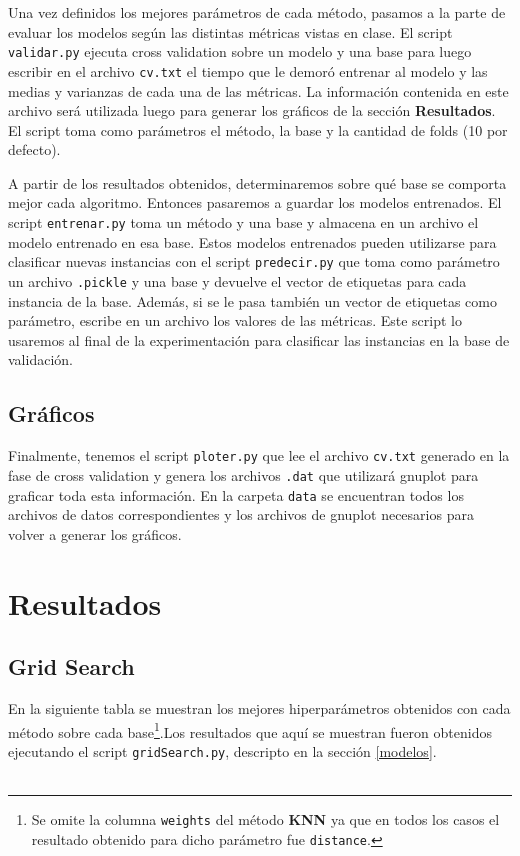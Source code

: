 \documentclass[10pt, a4paper]{article}
\begin{document}
Una vez definidos los mejores parámetros de cada método, pasamos a la parte de evaluar los modelos según las distintas métricas vistas en clase. El script \texttt{validar.py} ejecuta cross validation sobre un modelo y una base para luego escribir en el archivo \texttt{cv.txt} el tiempo que le demoró entrenar al modelo y las medias y varianzas de cada una de las métricas. La información contenida en este archivo será utilizada luego para generar los gráficos de la sección \textbf{Resultados}. El script toma como parámetros el método, la base y la cantidad de folds (10 por defecto).

A partir de los resultados obtenidos, determinaremos sobre qué base se comporta mejor cada algoritmo. Entonces pasaremos a guardar los modelos entrenados. El script \texttt{entrenar.py} toma un método y una base y almacena en un archivo el modelo entrenado en esa base. Estos modelos entrenados pueden utilizarse para clasificar nuevas instancias con el script \texttt{predecir.py} que toma como parámetro un archivo \texttt{.pickle} y una base y devuelve el vector de etiquetas para cada instancia de la base. Además, si se le pasa también un vector de etiquetas como parámetro, escribe en un archivo los valores de las métricas. Este script lo usaremos al final de la experimentación para clasificar las instancias en la base de validación.

\subsection{Gráficos}

Finalmente, tenemos el script \texttt{ploter.py} que lee el archivo \texttt{cv.txt} generado en la fase de cross validation y genera los archivos \texttt{.dat} que utilizará gnuplot para graficar toda esta información. En la carpeta \texttt{data} se encuentran todos los archivos de datos correspondientes y los archivos de gnuplot necesarios para volver a generar los gráficos.

\section{Resultados}

\subsection{Grid Search}
En la siguiente tabla se muestran los mejores hiperparámetros obtenidos con cada método sobre cada base\footnote{Se omite la columna \texttt{weights} del método \textbf{KNN} ya que en todos los casos el resultado obtenido para dicho parámetro fue \texttt{distance}.}.Los resultados que aquí se muestran fueron obtenidos ejecutando el script \texttt{gridSearch.py}, descripto en la sección \ref{modelos}.
\\\\
\end{document}
